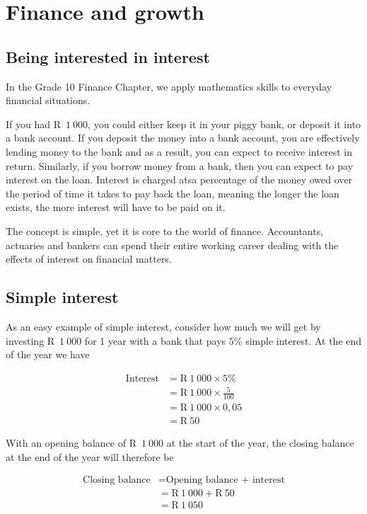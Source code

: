 \chapter{Finance and growth}

\section{Being interested in interest}

In the Grade 10 Finance Chapter, we apply mathematics skills to everyday financial situations.\par

If you had R~$1 ~000$, you could either keep it in your piggy bank, or deposit it into a bank account. If you deposit the
money into a bank account, you are effectively lending money to the bank and as a result, you can expect to receive
interest in return. Similarly, if you borrow money from a bank, then you can expect to pay interest on the loan.
Interest is charged atsa percentage of the money owed over the period of time it takes to pay back the loan, meaning
the longer the loan exists, the more interest will have to be paid on it.\par

The concept is simple, yet it is core to the world of finance. Accountants, actuaries and bankers can spend their
entire working career dealing with the effects of interest on financial matters.\par
{}
\section{Simple interest}
  
As an easy example of simple interest, consider how much we will get by investing R~$1~000$ for 1 year with a bank that pays $5\%$ simple interest. At the end of the year we have\par
\begin{align*}
    \mbox{Interest} &= \text{R}~1~000 \times 5\%\\
    &= \text{R}~1~000 \times \frac{5}{100}\\
    &= \text{R}~1~000 \times 0,05\\
    &= \text{R}~50
\end{align*}

With an opening balance of R~$1~000$ at the start of the year, the closing balance at the end of the year will therefore be\par 
\begin{align*}
    \mbox{Closing balance} &= \mbox{Opening balance + interest}\\
    &= \text{R}~1~000 + \text{R}~50\\
    &= \text{R}~1~050
\end{align*}

